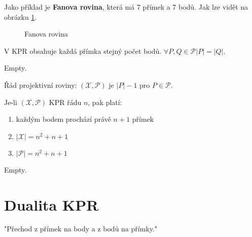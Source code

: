 Jako příklad je \textbf{Fanova rovina}, která má 7 přímek a 7 bodů. Jak lze vidět na obrázku \ref{fans-plane}.

\begin{figure}[!h]\centering
	\caption{Fanova rovina}
	\label{fans-plane}
\end{figure}

\begin{tvrz}
	V KPR obsahuje každá přímka stejný počet bodů. $\forall P,Q \in \mathcal{P} |P|=|Q|$.
\end{tvrz}

\begin{dukaz}
	Empty.
\end{dukaz}

\begin{definice}
	Řád projektivní roviny: $(\mathcal{X}, \mathcal{P})$ je $|P|-1$ pro $P \in \mathcal{P}$.
\end{definice} 

\begin{tvrz}
	Je-li $(\mathcal{X}, \mathcal{P})$ KPR řádu $n$, pak platí:
	
	\begin{enumerate}
		\item každým bodem prochází právě $n+1$ přímek
		\item $|\mathcal{X}| = n^{2} + n + 1$
		\item$|\mathcal{P}| = n^{2} + n + 1$
	\end{enumerate}
\end{tvrz}

\begin{dukaz}
	Empty.
\end{dukaz}

\section{Dualita KPR}

"Přechod z přímek na body a z bodů na přímky."


